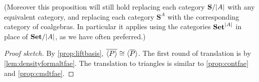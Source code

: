 \documentclass[11pt, oneside, article]{memoir}
\theoremstyle{plain}
\theoremstyle{definition}
\theoremstyle{remark}
\DeclarePairedDelimiter{\gen}{\langle}{\rangle}
\DeclarePairedDelimiter{\abs}{\lvert}{\rvert}
\newcommand{\tn}[1]{\textnormal{#1}}
\newcommand{\namedcat}[1]{\mathbf{#1}}
\newcommand{\cat}[1]{\mathbf{#1}}
\newcommand{\Set}{\namedcat{Set}}
\newcommand{\CoalgOn}[2]{{#2}^{#1}}
\newcommand{\CoalgS}[1]{\CoalgOn{#1}{\bS}}
\newcommand{\clift}[1]{\overline{#1}}
\newcommand{\pts}[1]{{\abs{#1}}}
\newcommand{\one}[1]{\pts{#1}}
\newcommand{\ptlift}[1]{\overline{#1}}
\newcommand{\carr}{\Sigma}
\newcommand{\reindex}[1]{\Delta_{#1}}
\newcommand{\car}[1]{\carr^{#1}}
\newcommand{\carA}{\car{\cA}}
\newcommand{\carB}{\car{\cB}}
\newcommand{\ph}[1]{#1}
\newcommand{\con}[2]{{#1}^{#2}}
\newcommand{\cmnd}[1]{{#1}}
\newcommand{\cA}{\cmnd{A}}
\newcommand{\cB}{\cmnd{B}}
\newcommand{\bB}{\cat{B}}
\newcommand{\bS}{\cat{S}}
\newcommand{\pP}{\ph{P}}
\newcommand{\cP}{\gen{\pP}}
\newcommand{\AS}{\CoalgS{\cA}}
\newcommand{\BS}{\CoalgS{\cB}}
\newcommand{\SetA}{\Set/\pts{\cA}}
\newcommand{\SetpA}{\Set^\pts{\cA}}
\newcommand{\SA}{\bS/\pts{\cA}}
\newcommand{\SB}{\bS/\pts{\cB}}
\newcommand{\hh}[2][]{#1 \tn{#2} #1}
\newcommand{\qqand}{\hh[\qquad]{and}}
\begin{document}
(Moreover this proposition will still hold replacing each category
$\SA$ with any equivalent category, and replacing each category $\AS$
with the corresponding category of coalgebras. In particular it
applies using the categories $\SetpA$ in place of $\SetA$, as we have
often preferred.)

\begin{proof}[Proof sketch]
  
  By \cref{prop:liftbasis}, $\clift{\cP} \cong
  \gen{\ptlift{\pP}}$. The first round of translation is by
  \cref{lem:densityformaltfae}. The translation to triangles is
  similar to \cref{prop:contfae} and \cref{prop:cmdtfae}.
\end{proof}
\end{document}
